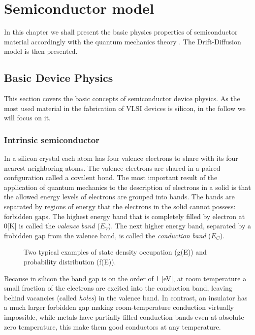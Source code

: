 \chapter{Semiconductor model}

In this chapter we shall present the basic physics properties of semiconductor material accordingly with the quantum mechanics theory \citep{ModernVLSIdevices}. The Drift-Diffusion model is then presented.

\section{Basic Device Physics}

This section covers the basic concepts of semiconductor device physics. As the most used material in the fabrication of VLSI devices is silicon, in the follow we will focus on it.

\subsection{Intrinsic semiconductor}
In a silicon crystal each atom has four valence electrons to share with its four nearest neighboring atoms. The valence electrons are shared in a paired configuration called a covalent bond. The most important result of the application of quantum mechanics to the description of electrons in a solid is that the allowed energy levels of electrons are grouped into bands. The bands are separated by regions of energy that the electrons in the solid cannot possess: forbidden gaps. The highest energy band that is completely filled by electron at 0[K] is called the \textit{valence band} ($E_V$). The next higher energy band, separated by a frobidden gap from the valence band, is called the \textit{conduction band} ($E_C$).

\begin{figure}[!h]
\centering
{}
\caption{Two typical examples of state density occupation (g(E)) and probability distribution (f(E)).  }
\end{figure}

Because in silicon the band gap is on the order of 1 [eV], at room temperature a small fraction of the electrons are excited into the conduction band, leaving behind vacancies (called \textit{holes}) in the valence band.
In contrast, an insulator has a much larger forbidden gap making room-temperature conduction virtually impossible, while metals have partially filled conduction bands even at absolute zero temperature, this make them good conductors at any temperature. 

